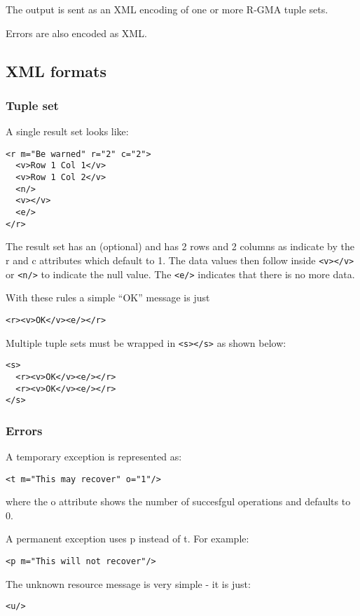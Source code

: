 The output is sent as an XML encoding of one or more R-GMA tuple sets. 

Errors are also encoded as XML.

\subsection{XML formats}

\subsubsection{Tuple set}\label{sec:TupleXML}

A single result set looks like:

\begin{verbatim}
<r m="Be warned" r="2" c="2">
  <v>Row 1 Col 1</v>
  <v>Row 1 Col 2</v>
  <n/>
  <v></v>
  <e/>
</r>
\end{verbatim}

The result set has an (optional) and has 2 rows and 2 columns as indicate by the
r and c attributes which default to 1. The data values then follow inside
\verb!<v></v>! or \verb!<n/>! to indicate the null value. The \verb!<e/>!
indicates that there is no more data.

With these rules a simple ``OK'' message is just

\begin{verbatim}
<r><v>OK</v><e/></r> 
\end{verbatim}

Multiple tuple sets must be wrapped in \verb!<s></s>! as shown below:

\begin{verbatim}
<s>
  <r><v>OK</v><e/></r> 
  <r><v>OK</v><e/></r>
</s> 
\end{verbatim}

\subsubsection{Errors}

A temporary exception is represented as:

\begin{verbatim}
<t m="This may recover" o="1"/>
\end{verbatim}

where the o attribute shows the number of succesfgul operations and defaults to
0.

A permanent exception uses p instead of t. For example:

\begin{verbatim}
<p m="This will not recover"/>
\end{verbatim}

The unknown resource message is very simple - it is just:

\begin{verbatim}
<u/>
\end{verbatim}




